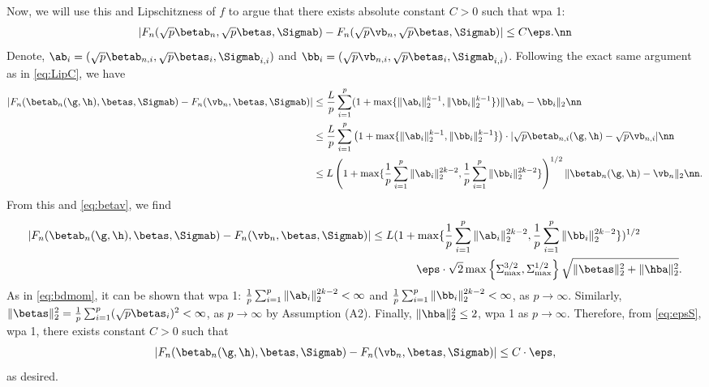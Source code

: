 Now, we will use this and Lipschitzness of $f$ to argue that there exists absolute constant $C>0$ such that wpa 1:
\begin{align}
|F_n(\sqrt{p}\betab_n,\sqrt{p}\betas,\Sigmab) - F_n(\sqrt{p}\vb_n,\sqrt{p}\betas,\Sigmab) | \leq C\eps.\nn
\end{align}
Denote, $\ab_i=(\sqrt{p}\betab_{n,i},\sqrt{p}\betas_i,\Sigmab_{i,i})$ and $\bb_i=(\sqrt{p}\vb_{n,i},\sqrt{p}\betas_i,\Sigmab_{i,i})$. Following the exact same argument as in \eqref{eq:LipC}, we have
\begin{align}
|F_n(\betab_n(\g,\h),\betas,\Sigmab) - F_n(\vb_n,\betas,\Sigmab)| &\leq \frac{L}{p}\sum_{i=1}^p (1+\max\{\|\ab_i\|_2^{k-1},\|\bb_i\|_2^{k-1}\})\|\ab_i-\bb_i\|_2\nn \\
&\leq \frac{L}{p}\sum_{i=1}^p \left(1+\max\{\|\ab_i\|_2^{k-1},\|\bb_i\|_2^{k-1}\}\right)\cdot|\sqrt{p}\betab_{n,i}(\g,\h) - \sqrt{p}\vb_{n,i}|\nn\\
&\leq L\left(1+\max\{\frac{1}{p}\sum_{i=1}^p \|\ab_i\|_2^{2k-2},\frac{1}{p}\sum_{i=1}^p\|\bb_i\|_2^{2k-2}\} \right)^{1/2}{\|\betab_{n}(\g,\h) - \vb_n\|_2}\nn.
\end{align}
From this and \eqref{eq:betav}, we find
\begin{align}
|F_n(\betab_n(\g,\h),\betas,\Sigmab) - F_n(\vb_n,\betas,\Sigmab)| &\leq 
L(1+\max\{\frac{1}{p}\sum_{i=1}^p \|\ab_i\|_2^{2k-2},\frac{1}{p}\sum_{i=1}^p\|\bb_i\|_2^{2k-2}\} )^{1/2} 
\\
&\qquad\qquad\eps\cdot\sqrt{2}\max\left\{\Sigma_{\max}^{3/2},\Sigma_{\max}^{1/2}\right\}\sqrt{\|\betas\|_2^2 + \|\hba\|_2^2}.\label{eq:epsS}
\end{align}
As in \eqref{eq:bdmom}, it can be shown that wpa 1: $\frac{1}{p}\sum_{i=1}^p \|\ab_i\|_2^{2k-2}<\infty$ and $\frac{1}{p}\sum_{i=1}^p \|\bb_i\|_2^{2k-2}<\infty$, as $p\rightarrow\infty$. Similarly, $\|\betas\|_2^2 = \frac{1}{p}\sum_{i=1}^p(\sqrt{p}\betas_i)^2<\infty$, as $p\rightarrow \infty$ by Assumption (A2).
Finally, $\|\hba\|_2^2\leq 2$, wpa 1 as $p\rightarrow\infty$. Therefore, from \eqref{eq:epsS}, wpa 1, there exists constant $C>0$ such that 
\begin{align}
|F_n(\betab_n(\g,\h),\betas,\Sigmab) - F_n(\vb_n,\betas,\Sigmab)| \leq C \cdot\eps,
\end{align}
as desired.


